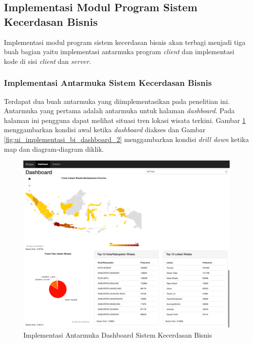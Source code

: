 \subsection{Implementasi Modul Program Sistem Kecerdasan Bisnis}
Implementasi modul program sistem kecerdasan bisnis akan terbagi menjadi tiga buah bagian yaitu implementasi antarmuka program \textit{client} dan implementasi kode di sisi \textit{client} dan \textit{server}. 

\subsubsection{Implementasi Antarmuka Sistem Kecerdasan Bisnis}
Terdapat dua buah antarmuka yang diimplementasikan pada penelitian ini. Antarmuka yang pertama adalah antarmuka untuk halaman \textit{dashboard}. Pada halaman ini pengguna dapat melihat situasi tren lokasi wisata terkini. Gambar \ref{fig:ui_implementasi_bi_dashboard_1} menggambarkan kondisi awal ketika \textit{dashboard} diakses dan Gambar \ref{fig:ui_implementasi_bi_dashboard_2} menggambarkan kondisi \textit{drill down} ketika map dan diagram-diagram diklik.

\begin{figure}[H]
	\centering
	\includegraphics[scale=0.35]{Gambar/ui-implementasi-bi-dashboard-01.png}
	\caption[Implementasi Antarmuka Dashboard Sistem Kecerdasan Bisnis]{Implementasi Antarmuka Dashboard Sistem Kecerdasan Bisnis} 
	\label{fig:ui_implementasi_bi_dashboard_1}
\end{figure}

